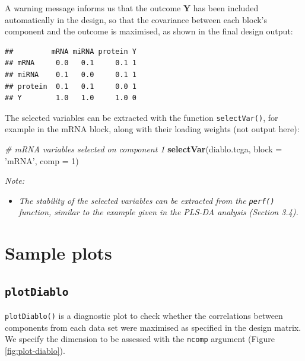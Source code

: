\documentclass[]{book}
\newenvironment{Shaded}{\begin{snugshade}}{\end{snugshade}}
\newcommand{\KeywordTok}[1]{\textcolor[rgb]{0.13,0.29,0.53}{\textbf{#1}}}
\newcommand{\DataTypeTok}[1]{\textcolor[rgb]{0.13,0.29,0.53}{#1}}
\newcommand{\DecValTok}[1]{\textcolor[rgb]{0.00,0.00,0.81}{#1}}
\newcommand{\StringTok}[1]{\textcolor[rgb]{0.31,0.60,0.02}{#1}}
\newcommand{\CommentTok}[1]{\textcolor[rgb]{0.56,0.35,0.01}{\textit{#1}}}
\newcommand{\OperatorTok}[1]{\textcolor[rgb]{0.81,0.36,0.00}{\textbf{#1}}}
\newcommand{\NormalTok}[1]{#1}
\providecommand{\tightlist}{%
  \setlength{\itemsep}{0pt}\setlength{\parskip}{0pt}}
\begin{document}
A warning message informs us that the outcome \(\boldsymbol Y\) has been
included automatically in the design, so that the covariance between
each block's component and the outcome is maximised, as shown in the
final design output:

\begin{Shaded}
\end{Shaded}

\begin{verbatim}
##         mRNA miRNA protein Y
## mRNA     0.0   0.1     0.1 1
## miRNA    0.1   0.0     0.1 1
## protein  0.1   0.1     0.0 1
## Y        1.0   1.0     1.0 0
\end{verbatim}

The selected variables can be extracted with the function
\texttt{selectVar()}, for example in the mRNA block, along with their
loading weights (not output here):

\begin{Shaded}
\begin{Highlighting}[]
\CommentTok{# mRNA variables selected on component 1}
\KeywordTok{selectVar}\NormalTok{(diablo.tcga, }\DataTypeTok{block =} \StringTok{'mRNA'}\NormalTok{, }\DataTypeTok{comp =} \DecValTok{1}\NormalTok{)}
\end{Highlighting}
\end{Shaded}

\emph{Note:}

\begin{itemize}
\tightlist
\item
  \emph{The stability of the selected variables can be extracted from
  the \texttt{perf()} function, similar to the example given in the
  PLS-DA analysis (Section 3.4).}
\end{itemize}

\section{Sample plots}\label{diablo:result:sampleplot}

\subsection{\texorpdfstring{\texttt{plotDiablo}}{plotDiablo}}\label{plotdiablo}

\texttt{plotDiablo()} is a diagnostic plot to check whether the
correlations between components from each data set were maximised as
specified in the design matrix. We specify the dimension to be assessed
with the \texttt{ncomp} argument (Figure \ref{fig:plot-diablo}).
\end{document}

